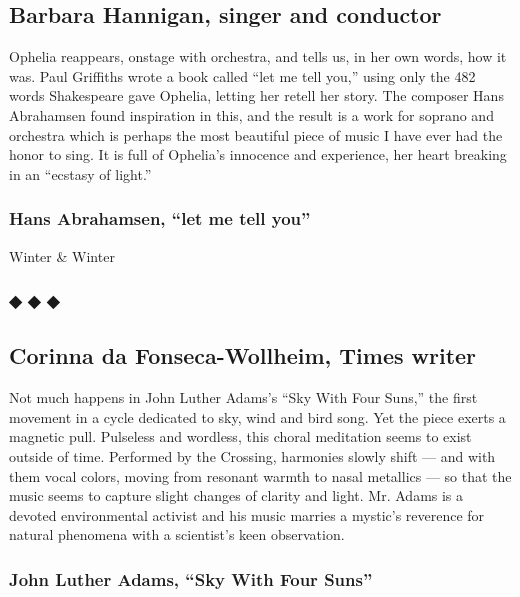 \hypertarget{barbara-hannigan-singer-and-conductor}{%
\subsection{Barbara Hannigan, singer and
conductor}\label{barbara-hannigan-singer-and-conductor}}

Ophelia reappears, onstage with orchestra, and tells us, in her own
words, how it was. Paul Griffiths wrote a book called ``let me tell
you,'' using only the 482 words Shakespeare gave Ophelia, letting her
retell her story. The composer Hans Abrahamsen found inspiration in
this, and the result is a work for soprano and orchestra which is
perhaps the most beautiful piece of music I have ever had the honor to
sing. It is full of Ophelia's innocence and experience, her heart
breaking in an ``ecstasy of light.''

\hypertarget{hans-abrahamsen-let-me-tell-you}{%
\subsubsection{Hans Abrahamsen, ``let me tell
you''}\label{hans-abrahamsen-let-me-tell-you}}

Winter \& Winter

\hypertarget{---16}{%
\subsubsection{◆ ◆ ◆}\label{---16}}

\hypertarget{corinna-da-fonseca-wollheim-times-writer}{%
\subsection{Corinna da Fonseca-Wollheim, Times
writer}\label{corinna-da-fonseca-wollheim-times-writer}}

Not much happens in John Luther Adams's ``Sky With Four Suns,'' the
first movement in a cycle dedicated to sky, wind and bird song. Yet the
piece exerts a magnetic pull. Pulseless and wordless, this choral
meditation seems to exist outside of time. Performed by the Crossing,
harmonies slowly shift --- and with them vocal colors, moving from
resonant warmth to nasal metallics --- so that the music seems to
capture slight changes of clarity and light. Mr. Adams is a devoted
environmental activist and his music marries a mystic's reverence for
natural phenomena with a scientist's keen observation.

\hypertarget{john-luther-adams-sky-with-four-suns}{%
\subsubsection{John Luther Adams, ``Sky With Four
Suns''}\label{john-luther-adams-sky-with-four-suns}}

